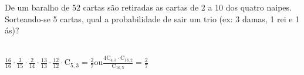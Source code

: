 \begin{ex}
 De um baralho de 52 cartas são retiradas as cartas de 2 a 10 dos quatro naipes. Sorteando-se 5 cartas, qual a probabilidade de sair um trio (ex: 3 damas, 1 rei e 1 ás)?
   \begin{sol}
       \phantom{A} \\
    $\frac{16}{16}\cdot\frac{3}{15}\cdot\frac{2}{14}\cdot\frac{13}{13}\cdot\frac{12}{12}\cdot\mathrm{C}_{5,3}=\frac{2}{7}$\hspace{0.2cm}ou\hspace{0.2cm}$\frac{4\mathrm{C}_{4,3}\cdot\mathrm{C}_{{13},2}}{\mathrm{C}_{{16},5}}=\frac{2}{7}$
   \end{sol}
\end{ex}